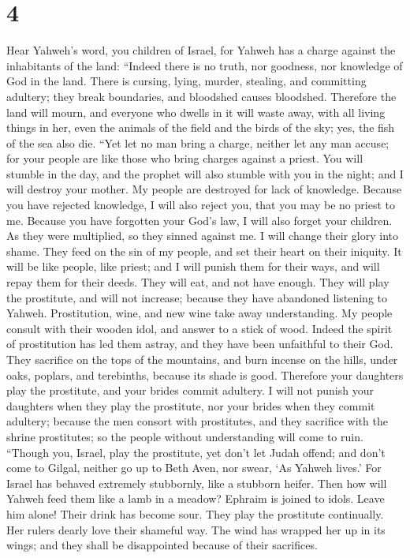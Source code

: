 \hypertarget{section-3}{%
\section{4}\label{section-3}}

 Hear Yahweh's word, you children of Israel, for Yahweh
has a charge against the inhabitants of the land: ``Indeed there is no
truth, nor goodness, nor knowledge of God in the land. 
There is cursing, lying, murder, stealing, and committing adultery; they
break boundaries, and bloodshed causes bloodshed. 
Therefore the land will mourn, and everyone who dwells in it will waste
away, with all living things in her, even the animals of the field and
the birds of the sky; yes, the fish of the sea also die. 
``Yet let no man bring a charge, neither let any man accuse; for your
people are like those who bring charges against a priest. 
You will stumble in the day, and the prophet will also stumble with you
in the night; and I will destroy your mother.  My people
are destroyed for lack of knowledge. Because you have rejected
knowledge, I will also reject you, that you may be no priest to me.
Because you have forgotten your God's law, I will also forget your
children.  As they were multiplied, so they sinned against
me. I will change their glory into shame.  They feed on
the sin of my people, and set their heart on their iniquity.
 It will be like people, like priest; and I will punish
them for their ways, and will repay them for their deeds.
 They will eat, and not have enough. They will play the
prostitute, and will not increase; because they have abandoned listening
to Yahweh.  Prostitution, wine, and new wine take away
understanding.  My people consult with their wooden idol,
and answer to a stick of wood. Indeed the spirit of prostitution has led
them astray, and they have been unfaithful to their God. 
They sacrifice on the tops of the mountains, and burn incense on the
hills, under oaks, poplars, and terebinths, because its shade is good.
Therefore your daughters play the prostitute, and your brides commit
adultery.  I will not punish your daughters when they
play the prostitute, nor your brides when they commit adultery; because
the men consort with prostitutes, and they sacrifice with the shrine
prostitutes; so the people without understanding will come to ruin.
 ``Though you, Israel, play the prostitute, yet don't let
Judah offend; and don't come to Gilgal, neither go up to Beth Aven, nor
swear, `As Yahweh lives.'  For Israel has behaved
extremely stubbornly, like a stubborn heifer. Then how will Yahweh feed
them like a lamb in a meadow?  Ephraim is joined to
idols. Leave him alone!  Their drink has become sour.
They play the prostitute continually. Her rulers dearly love their
shameful way.  The wind has wrapped her up in its wings;
and they shall be disappointed because of their sacrifices.

